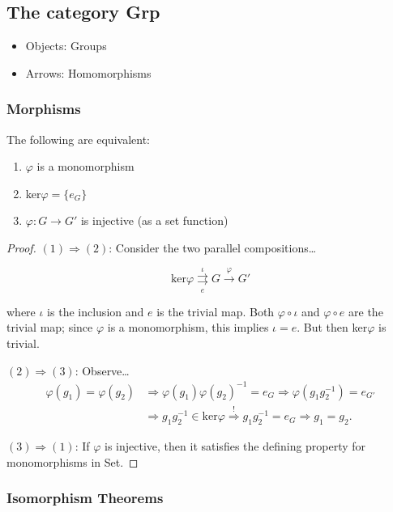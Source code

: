 \subsection{The category Grp}
\begin{itemize}
  \item Objects: Groups
  \item Arrows: Homomorphisms
\end{itemize}

\subsubsection{Morphisms}

\begin{proposition}
The following are equivalent:
\begin{enumerate}
  \item $\varphi$ is a monomorphism
  \item ker$\varphi = \{ e_G \}$
  \item $\varphi : G \rightarrow G'$ is injective (as a set function)
\end{enumerate}
\end{proposition}

\begin{proof}
$(1) \Rightarrow (2)$: Consider the two parallel compositions\dots

$$\textrm{ker}\varphi \underset{e}{\overset{\iota}{\rightrightarrows}} G \xrightarrow[]{\varphi} G'$$

where $\iota$ is the inclusion and $e$ is the trivial map. Both $\varphi \circ \iota$ and $\varphi \circ e$ are the trivial map;
since $\varphi$ is a monomorphism, this implies $\iota = e$. But then ker$\varphi$ is trivial. 

\noindent $(2) \Rightarrow (3)$: Observe\dots
\begin{align*}
\varphi(g_1) = \varphi(g_2) &\Rightarrow \varphi(g_1)\varphi(g_2)^{-1} = e_G \Rightarrow \varphi(g_1g_2^{-1}) = e_{G'}\\
						    &\Rightarrow g_1g_2^{-1} \in \textrm{ker}\varphi \overset{!}{\Rightarrow} g_1g_2^{-1} = e_G \Rightarrow g_1 = g_2.
\end{align*}

\noindent $(3) \Rightarrow (1)$: If $\varphi$ is injective, then it satisfies the defining property for monomorphisms in Set.
\end{proof}

\subsubsection{Isomorphism Theorems}\label{grpisomorphismtheorems}


